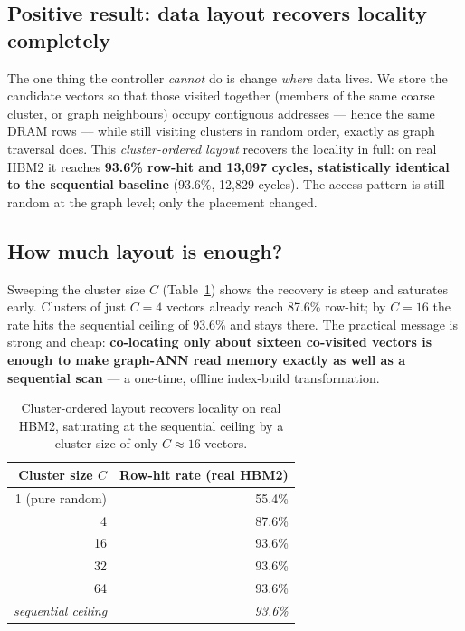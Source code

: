 \documentclass[11pt,a4paper]{article}
\begin{document}
\subsection{Positive result: data layout recovers locality completely}

The one thing the controller \emph{cannot} do is change \emph{where} data lives. We store the
candidate vectors so that those visited together (members of the same coarse cluster, or graph
neighbours) occupy contiguous addresses --- hence the same DRAM rows --- while still visiting clusters
in random order, exactly as graph traversal does. This \emph{cluster-ordered layout} recovers the
locality in full: on real HBM2 it reaches \textbf{93.6\% row-hit and 13{,}097 cycles, statistically
identical to the sequential baseline} (93.6\%, 12{,}829 cycles). The access pattern is still random at
the graph level; only the placement changed.

\subsection{How much layout is enough?}

Sweeping the cluster size $C$ (Table~\ref{tab:layout}) shows the recovery is steep and saturates
early. Clusters of just $C{=}4$ vectors already reach 87.6\% row-hit; by $C{=}16$ the rate hits the
sequential ceiling of 93.6\% and stays there. The practical message is strong and cheap:
\textbf{co-locating only about sixteen co-visited vectors is enough to make graph-ANN read memory
exactly as well as a sequential scan} --- a one-time, offline index-build transformation.

\begin{table}[h]
\centering
\renewcommand{\arraystretch}{1.2}
\begin{tabular}{rr}
\toprule
\textbf{Cluster size $C$} & \textbf{Row-hit rate (real HBM2)} \\
\midrule
1 \; (pure random)         & 55.4\% \\
4                          & 87.6\% \\
16                         & 93.6\% \\
32                         & 93.6\% \\
64                         & 93.6\% \\
\midrule
\emph{sequential ceiling}  & \emph{93.6\%} \\
\bottomrule
\end{tabular}
\caption{Cluster-ordered layout recovers locality on real HBM2, saturating at the sequential ceiling
by a cluster size of only $C\!\approx\!16$ vectors.}
\label{tab:layout}
\end{table}
\end{document}
